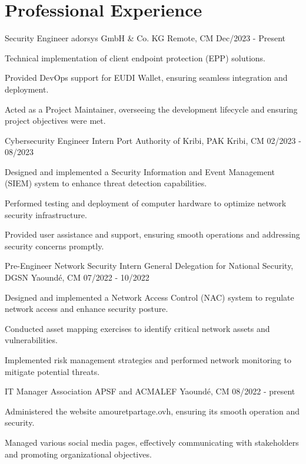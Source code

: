 \section{Professional Experience}

\cventry
{Security Engineer} %
{adorsys GmbH \& Co. KG} %
{Remote, CM} %
{Dec/2023 - Present} %
\begin{cvitems}
\item {Technical implementation of client endpoint protection (EPP) solutions.}
\item {Provided DevOps support for EUDI Wallet, ensuring seamless integration and deployment.}
\item {Acted as a Project Maintainer, overseeing the development lifecycle and ensuring project objectives were met.}
\end{cvitems}

\cventry
{Cybersecurity Engineer Intern} %
{Port Authority of Kribi, PAK} %
{Kribi, CM} %
{02/2023 - 08/2023} %
{
\begin{cvitems}
\item {Designed and implemented a Security Information and Event Management (SIEM) system to enhance threat detection capabilities.}
\item {Performed testing and deployment of computer hardware to optimize network security infrastructure.}
\item {Provided user assistance and support, ensuring smooth operations and addressing security concerns promptly.}
\end{cvitems}
}

\cventry
{Pre-Engineer Network Security Intern} %
{General Delegation for National Security, DGSN} %
{Yaoundé, CM} %
{07/2022 - 10/2022} %
{
\begin{cvitems}
\item {Designed and implemented a Network Access Control (NAC) system to regulate network access and enhance security posture.}
\item {Conducted asset mapping exercises to identify critical network assets and vulnerabilities.}
\item {Implemented risk management strategies and performed network monitoring to mitigate potential threats.}
\end{cvitems}
}

\cventry
{IT Manager} %
{Association APSF and ACMALEF} %
{Yaoundé, CM} %
{08/2022 - present} %
{
\begin{cvitems}
\item {Administered the website amouretpartage.ovh, ensuring its smooth operation and security.}
\item {Managed various social media pages, effectively communicating with stakeholders and promoting organizational objectives.}
\end{cvitems}
}
